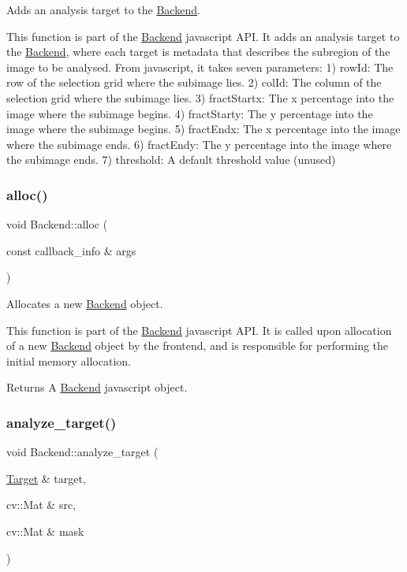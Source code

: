 Adds an analysis target to the \hyperlink{class_backend}{Backend}. 

This function is part of the \hyperlink{class_backend}{Backend} javascript A\+PI. It adds an analysis target to the \hyperlink{class_backend}{Backend}, where each target is metadata that describes the subregion of the image to be analysed. From javascript, it takes seven parameters\+: 1) row\+Id\+: The row of the selection grid where the subimage lies. 2) col\+Id\+: The column of the selection grid where the subimage lies. 3) fract\+Startx\+: The x percentage into the image where the subimage begins. 4) fract\+Starty\+: The y percentage into the image where the subimage begins. 5) fract\+Endx\+: The x percentage into the image where the subimage ends. 6) fract\+Endy\+: The y percentage into the image where the subimage ends. 7) threshold\+: A default threshold value (unused) \mbox{\label{class_backend_af235a0e3a5689fb47afe9b392b93d979}} 
\subsubsection{\texorpdfstring{alloc()}{alloc()}}
{\footnotesize\ttfamily void Backend\+::alloc (\begin{DoxyParamCaption}\item[{const callback\+\_\+info \&}]{args }\end{DoxyParamCaption})\hspace{0.3cm}{\ttfamily [static]}}



Allocates a new \hyperlink{class_backend}{Backend} object. 

This function is part of the \hyperlink{class_backend}{Backend} javascript A\+PI. It is called upon allocation of a new \hyperlink{class_backend}{Backend} object by the frontend, and is responsible for performing the initial memory allocation.

\begin{DoxyReturn}{Returns}
A \hyperlink{class_backend}{Backend} javascript object. 
\end{DoxyReturn}
\mbox{\label{class_backend_a149d05a4861bc09a73908f9817666586}} 
\subsubsection{\texorpdfstring{analyze\+\_\+target()}{analyze\_target()}}
{\footnotesize\ttfamily void Backend\+::analyze\+\_\+target (\begin{DoxyParamCaption}\item[{\hyperlink{struct_backend_1_1_target}{Target} \&}]{target,  }\item[{cv\+::\+Mat \&}]{src,  }\item[{cv\+::\+Mat \&}]{mask }\end{DoxyParamCaption})\hspace{0.3cm}{\ttfamily [static]}}



